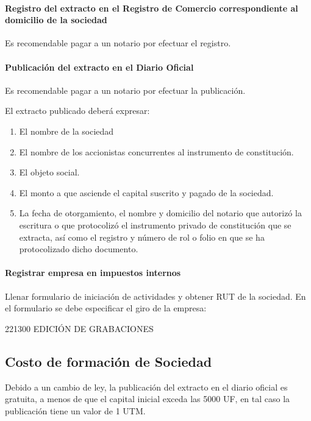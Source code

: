     
\paragraph{Registro del extracto en el Registro de Comercio correspondiente al domicilio de la
    sociedad}
		Es recomendable pagar a un notario por efectuar el registro.
\paragraph{Publicación del extracto en el Diario Oficial}
		Es recomendable pagar a un notario por efectuar la publicación.

    El extracto publicado deberá expresar:
    \begin{enumerate}
        \item  El nombre de la sociedad
        \item El nombre de los accionistas concurrentes al instrumento de
        constitución.
        \item El objeto social.
        \item El monto a que asciende el capital suscrito y pagado de la
        sociedad.
        \item La fecha de otorgamiento, el nombre y domicilio del notario que
        autorizó la escritura o que protocolizó el instrumento privado de
        constitución que se extracta, así como el registro y número de rol o
        folio en que se ha protocolizado dicho documento.
    \end{enumerate}

\paragraph{Registrar empresa en impuestos internos}
		
		Llenar formulario de iniciación de actividades y obtener RUT de la sociedad. En el formulario se debe especificar el giro de la empresa:

	221300 EDICIÓN DE GRABACIONES
	

\subsection{Costo de formación de Sociedad}
Debido a un cambio de ley, la publicación del extracto en el diario oficial es gratuita, a menos de que el capital inicial exceda las 5000 UF, en tal caso la publicación tiene un valor de 1 UTM.

